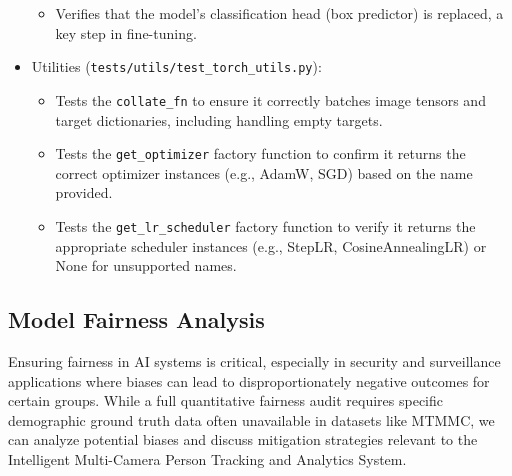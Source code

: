\begin{itemize}
\begin{itemize}
        \item Verifies that the model's classification head (box predictor) is replaced, a key step in fine-tuning.
    \end{itemize}
    \item Utilities (\texttt{tests/utils/test\_torch\_utils.py}):
    \begin{itemize}
        \item Tests the \texttt{collate\_fn} to ensure it correctly batches image tensors and target dictionaries, including handling empty targets.
        \item Tests the \texttt{get\_optimizer} factory function to confirm it returns the correct optimizer instances (e.g., AdamW, SGD) based on the name provided.
        \item Tests the \texttt{get\_lr\_scheduler} factory function to verify it returns the appropriate scheduler instances (e.g., StepLR, CosineAnnealingLR) or None for unsupported names.
    \end{itemize}
\end{itemize}

\subsection{Model Fairness Analysis}
\label{subsection:model_fairness_analysis}
Ensuring fairness in AI systems is critical, especially in security and surveillance applications where biases can lead to disproportionately negative outcomes for certain groups. While a full quantitative fairness audit requires specific demographic ground truth data often unavailable in datasets like MTMMC, we can analyze potential biases and discuss mitigation strategies relevant to the Intelligent Multi-Camera Person Tracking and Analytics System.

